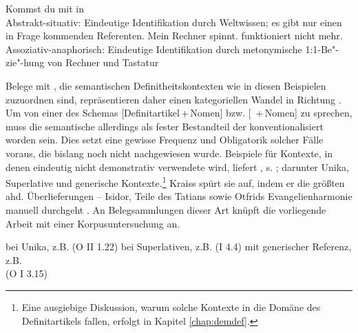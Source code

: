 \begin{exe}
	\ex 
	\begin{xlist} \label{ex:sem-def}\raggedright
		\ex \label{ex:sem-def1} Kommst du mit in  \\ Abstrakt-situativ: Eindeutige Identifikation durch Weltwissen; es gibt nur einen in Frage kommenden Referenten. 
		\ex \label{ex:sem-def2}  Mein Rechner spinnt.  funktioniert nicht mehr. \\ Assoziativ-anaphorisch: Eindeutige Identifikation durch metonymische  1:1-Be"-zie"-hung von Rechner und Tastatur
		\end{xlist}
\end{exe}
\noindent
Belege mit , die semantischen  Definitheitskontexten  wie in diesen Beispielen zuzuordnen sind, repräsentieren daher einen kategoriellen Wandel in Richtung . Um von einer  des Schemas  [Definitartikel\,+\,Nomen]  bzw. [ \,+\,Nomen] zu sprechen, muss die semantische 
 allerdings als fester Bestandteil der   konventionalisiert worden sein. Dies setzt eine gewisse Frequenz und Obligatorik solcher Fälle voraus, die bislang noch nicht nachgewiesen wurde. Beispiele für Kontexte, in denen  eindeutig nicht demonstrativ verwendete wird, liefert \textcite[135--137]{Kraiss2014}, s. ; darunter  Unika, Superlative  und generische  Kontexte.\footnote{Eine ausgiebige Diskussion, warum solche Kontexte in die Domäne des Definitartikels  fallen, erfolgt in Kapitel \ref{chap:demdef}.}  Kraiss spürt sie auf, indem er  die größten ahd. Überlieferungen -- Isidor, Teile des Tatians sowie Otfrids Evangelienharmonie manuell durchgeht \parencite{Kraiss2012}. An Belegsammlungen dieser Art \parencite[vgl. z.B. auch][]{Luhr2008,Schlachter2015} knüpft die vorliegende Arbeit mit einer Korpusuntersuchung  an.

\begin{exe}
	\ex 
	\begin{xlist} \label{ex:kraiss}
		\ex \label{ex:kraiss-unika}  bei  Unika, z.B.   (O II 1.22) 
		\ex \label{ex:kraiss-superlativ}  bei  Superlativen, z.B.   (I 4.4)
				\ex \label{ex:kraiss-generisch}  mit  generischer Referenz, z.B.  \\  (O I 3.15)
		\end{xlist}
\end{exe}

